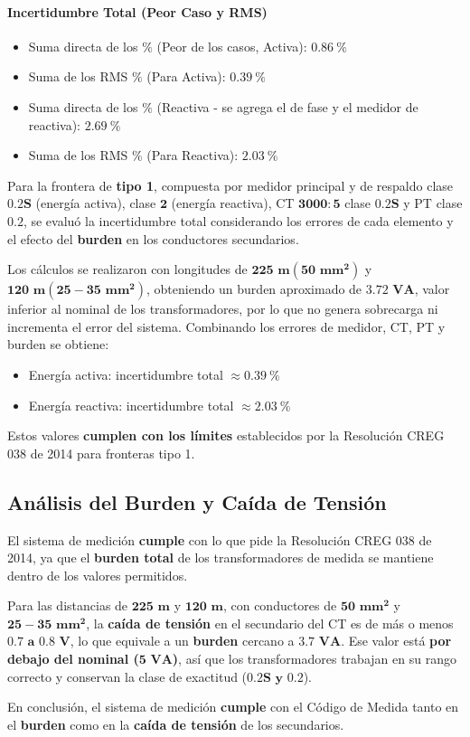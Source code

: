 \paragraph{Incertidumbre Total (Peor Caso y RMS)}
\begin{itemize}
    \item Suma directa de los $\%$ (Peor de los casos, Activa): $\mathbf{0.86 \ \%}$
    \item Suma de los RMS $\%$ (Para Activa): $\mathbf{0.39 \ \%}$
    \item Suma directa de los $\%$ (Reactiva - se agrega el de fase y el medidor de reactiva): $\mathbf{2.69 \ \%}$
    \item Suma de los RMS $\%$ (Para Reactiva): $\mathbf{2.03 \ \%}$
\end{itemize}

Para la frontera de \textbf{tipo 1}, compuesta por medidor principal y de respaldo clase $\mathbf{0.2S}$ (energía activa), clase $\mathbf{2}$ (energía reactiva), CT $\mathbf{3000:5}$ clase $\mathbf{0.2S}$ y PT clase $\mathbf{0.2}$, se evaluó la incertidumbre total considerando los errores de cada elemento y el efecto del \textbf{burden} en los conductores secundarios.

Los cálculos se realizaron con longitudes de $\mathbf{225 \text{ m} (50 \text{ mm}^2)}$ y $\mathbf{120 \text{ m} (25-35 \text{ mm}^2)}$, obteniendo un burden aproximado de $\mathbf{3.72 \text{ VA}}$, valor inferior al nominal de los transformadores, por lo que no genera sobrecarga ni incrementa el error del sistema. Combinando los errores de medidor, CT, PT y burden se obtiene:
\begin{itemize}
    \item Energía activa: incertidumbre total $\approx \mathbf{0.39 \ \%}$
    \item Energía reactiva: incertidumbre total $\approx \mathbf{2.03 \ \%}$
\end{itemize}
Estos valores \textbf{cumplen con los límites} establecidos por la Resolución CREG 038 de 2014 para fronteras tipo 1.

\subsection{Análisis del Burden y Caída de Tensión} \label{subsec:analisis_burden_caida_tension}
El sistema de medición \textbf{cumple} con lo que pide la Resolución CREG 038 de 2014, ya que el \textbf{burden total} de los transformadores de medida se mantiene dentro de los valores permitidos.

Para las distancias de $\mathbf{225 \text{ m}}$ y $\mathbf{120 \text{ m}}$, con conductores de $\mathbf{50 \text{ mm}^2}$ y $\mathbf{25-35 \text{ mm}^2}$, la \textbf{caída de tensión} en el secundario del CT es de más o menos $\mathbf{0.7 \text{ a } 0.8 \text{ V}}$, lo que equivale a un \textbf{burden} cercano a $\mathbf{3.7 \text{ VA}}$. Ese valor está \textbf{por debajo del nominal ($\mathbf{5 \text{ VA}}$)}, así que los transformadores trabajan en su rango correcto y conservan la clase de exactitud ($\mathbf{0.2S \text{ y } 0.2}$).

En conclusión, el sistema de medición \textbf{cumple} con el Código de Medida tanto en el \textbf{burden} como en la \textbf{caída de tensión} de los secundarios.